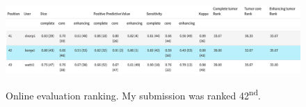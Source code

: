 \documentclass[12pt,a4paper,twoside,openright]{report}
\newlength\figureheight
\newlength\figurewidth
\begin{document}
\begin{figure}
	\centering
	\label{fig:online_eval_rank}
	\includegraphics[width=\textwidth]{ranking_table_header}
	\includegraphics[width=\textwidth]{pereira_model_ranked_results}
	\caption{Online evaluation ranking. My submission was ranked 42\textsuperscript{nd}.}
\end{figure}

%
%	
\end{document}
